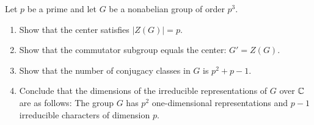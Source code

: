 \begin{problem}
Let $p$ be a prime and let $G$ be a nonabelian group of order $p^3$.
\begin{enumerate}[font=\normalfont,label=\textbf{(\Alph*)}]


  \item Show that the center satisfies $\lvert Z(G) \rvert = p$.
  \item Show that the commutator subgroup equals the center: $G'= Z(G)$.
  \item Show that the number of conjugacy classes in $G$ is $p^2 + p - 1$.
  \item Conclude that the dimensions of the irreducible representations of $G$ over $\mathbb{C}$ are as follows: The group $G$ has $p^2$ one-dimensional representations and $p-1$ irreducible characters of dimension $p$.
\end{enumerate}
\end{problem}

